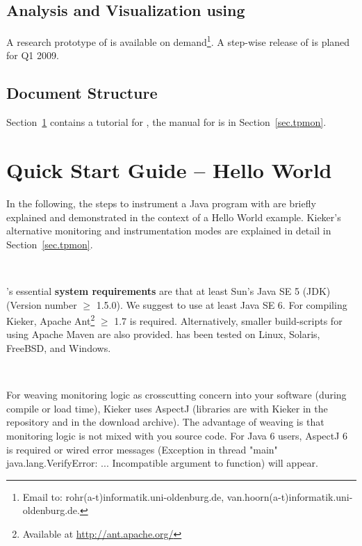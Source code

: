 \documentclass[a4paper,12pt]{scrartcl}
\begin{document}
\subsection{Analysis and Visualization using \tpan{}}
A research prototype of \tpan{} is available on demand\footnote{Email to: rohr(a-t)informatik.uni-oldenburg.de, van.hoorn(a-t)informatik.uni-oldenburg.de.}. A step-wise release of \tpan{} is planed for Q1 2009.

\subsection{Document Structure}

Section~\ref{sec.tpmon.tutorial} contains a tutorial for \tpmon{}, the manual for \tpmon{} is in Section~\ref{sec.tpmon}.%


\section{\tpmon{} Quick Start Guide -- Hello World}\label{sec.tpmon.tutorial}
In the following, the steps to instrument a Java program with \tpmon{} are briefly explained and demonstrated in the context of a Hello World example. Kieker's alternative monitoring and instrumentation modes are explained in detail in Section~\ref{sec.tpmon}.

\

\tpmon{}'s essential \textbf{system requirements} are that at least Sun's Java SE 5 (JDK) (Version number $\geq$ 1.5.0). We suggest to use at least Java SE 6. For compiling Kieker, Apache Ant\footnote{Available at \url{http://ant.apache.org/}} $\geq$ 1.7 is required. Alternatively, smaller build-scripts for using Apache Maven are 
also provided. \tpmon{} has been tested on Linux, Solaris, FreeBSD, and Windows.

\

For weaving monitoring logic as crosscutting concern into your software (during compile or load time), Kieker uses AspectJ (libraries are with Kieker in the repository and in the download archive). The advantage of weaving is that monitoring logic is not mixed with you source code. For Java 6 users, AspectJ 6 is required or wired error messages (Exception in thread "main" java.lang.VerifyError: ... Incompatible argument to function) will appear.
\end{document}
